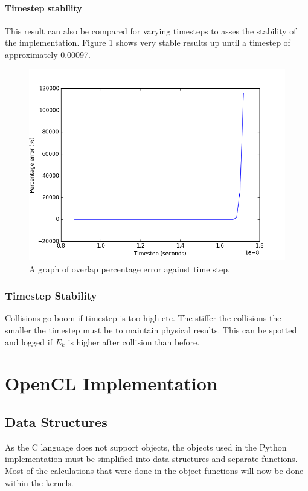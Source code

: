 \documentclass[10pt,a4paper,titlepage]{report}
\begin{document}
\subsubsection{Timestep stability}
This result can also be compared for varying timesteps to asses the stability of the implementation. Figure \ref{fig:overlap_percentage_error_against_timestep} shows very stable results up until a timestep of approximately 0.00097.
\begin{figure}[!htb]
\centering
\includegraphics[scale=0.75]{figures/ParticleBounceTimestepAgainstPercentageError.png}
\caption{A graph of overlap percentage error against time step.}
\label{fig:overlap_percentage_error_against_timestep}
\end{figure}
\subsection{Timestep Stability}
Collisions go boom if timestep is too high etc. %
The stiffer the collisions the smaller the timestep must be to maintain physical results.
This can be spotted and logged if $E_{k}$ is higher after collision than before.
\chapter{OpenCL Implementation}
\section{Data Structures}
As the C language does not support objects, the objects used in the Python implementation must be simplified into data structures and separate functions. Most of the calculations that were done in the object functions will now be done within the kernels.
\end{document}
